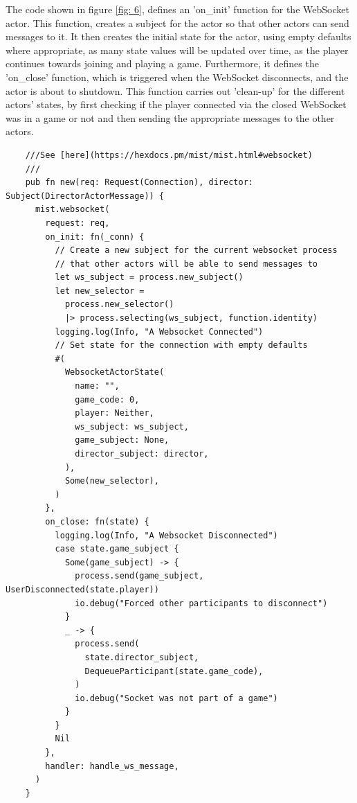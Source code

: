 \documentclass[]{final}
\begin{document}
\noindent
\begin{minipage}[t]{17em}
  The code shown in figure \ref{fig: 6}, defines an 'on\_init' function for the WebSocket actor. This function,
  creates a subject for the actor so that other actors can send messages to it.
  It then creates the initial state for the actor, using empty defaults where appropriate,
  as many state values will be updated over time, as the player continues towards
  joining and playing a game. Furthermore, it defines the 'on\_close' function,
  which is triggered when the WebSocket disconnects, and the actor is about to shutdown. This function carries out
  'clean-up' for the different actors' states, by first checking if the player
  connected via the closed WebSocket was in a game or not and then sending the
  appropriate messages to the other actors.
\end{minipage}
\hfill
\begin{minipage}[t]{20em}
  \begin{lstlisting}
    ///See [here](https://hexdocs.pm/mist/mist.html#websocket)
    ///
    pub fn new(req: Request(Connection), director: Subject(DirectorActorMessage)) {
      mist.websocket(
        request: req,
        on_init: fn(_conn) {
          // Create a new subject for the current websocket process
          // that other actors will be able to send messages to
          let ws_subject = process.new_subject()
          let new_selector =
            process.new_selector()
            |> process.selecting(ws_subject, function.identity)
          logging.log(Info, "A Websocket Connected")
          // Set state for the connection with empty defaults
          #(
            WebsocketActorState(
              name: "",
              game_code: 0,
              player: Neither,
              ws_subject: ws_subject,
              game_subject: None,
              director_subject: director,
            ),
            Some(new_selector),
          )
        },
        on_close: fn(state) {
          logging.log(Info, "A Websocket Disconnected")
          case state.game_subject {
            Some(game_subject) -> {
              process.send(game_subject, UserDisconnected(state.player))
              io.debug("Forced other participants to disconnect")
            }
            _ -> {
              process.send(
                state.director_subject,
                DequeueParticipant(state.game_code),
              )
              io.debug("Socket was not part of a game")
            }
          }
          Nil
        },
        handler: handle_ws_message,
      )
    }
  \end{lstlisting}
  \label{fig:6}
\end{minipage}
\end{document}
